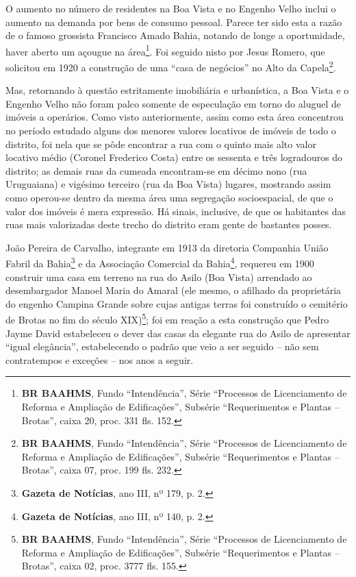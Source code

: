 O aumento no número de residentes na Boa Vista e no Engenho Velho inclui o aumento na demanda por bens de consumo pessoal. Parece ter sido esta a razão de o famoso grossista Francisco Amado Bahia, notando de longe a oportunidade, haver aberto um açougue na área\footnote{\textbf{BR BAAHMS}, Fundo ``Intendência'', Série ``Processos de Licenciamento de Reforma e Ampliação de Edificações'', Subsérie ``Requerimentos e Plantas -- Brotas'', caixa 20, proc. 331 fls. 152.}. Foi seguido nisto por Jesus Romero, que solicitou em 1920 a construção de uma ``casa de negócios'' no Alto da Capela\footnote{\textbf{BR BAAHMS}, Fundo ``Intendência'', Série ``Processos de Licenciamento de Reforma e Ampliação de Edificações'', Subsérie ``Requerimentos e Plantas -- Brotas'', caixa 07, proc. 199 fls. 232.}. 


Mas, retornando à questão estritamente imobiliária e urbanística, a Boa Vista e o Engenho Velho não foram palco somente de especulação em torno do aluguel de imóveis a operários. Como visto anteriormente, assim como esta área concentrou no período estudado alguns dos menores valores locativos de imóveis de todo o distrito, foi nela que se pôde encontrar a rua com o quinto mais alto valor locativo médio (Coronel Frederico Costa) entre os sessenta e três logradouros do distrito; as demais ruas da cumeada encontram-se em décimo nono (rua Uruguaiana) e vigésimo terceiro (rua da Boa Vista) lugares, mostrando assim como operou-se dentro da mesma área uma segregação socioespacial, de que o valor dos imóveis é mera expressão. Há sinais, inclusive, de que os habitantes das ruas mais valorizadas deste trecho do distrito eram gente de bastantes posses.

João Pereira de Carvalho, integrante em 1913 da diretoria Companhia União Fabril da Bahia\footnote{\textbf{Gazeta de Notícias}, ano III, nº 179, p. 2.} e da Associação Comercial da Bahia\footnote{\textbf{Gazeta de Notícias}, ano III, nº 140, p. 2.}, requereu em 1900 construir uma casa em terreno na rua do Asilo (Boa Vista) arrendado ao desembargador Manoel Maria do Amaral (ele mesmo, o afilhado da proprietária do engenho Campina Grande sobre cujas antigas terras foi construído o cemitério de Brotas no fim do século XIX)\footnote{\textbf{BR BAAHMS}, Fundo ``Intendência'', Série ``Processos de Licenciamento de Reforma e Ampliação de Edificações'', Subsérie ``Requerimentos e Plantas -- Brotas'', caixa 02, proc. 3777 fls. 155.}; foi em reação a esta construção que Pedro Jayme David estabeleceu o dever das casas da elegante rua do Asilo de apresentar ``igual elegância'', estabelecendo o padrão que veio a ser seguido -- não sem contratempos e exceções -- nos anos a seguir.

